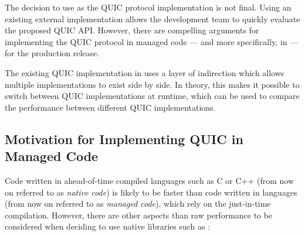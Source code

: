 The decision to use \libmsquic{} as the QUIC protocol implementation is not final. Using an existing
external implementation allows the development team to quickly evaluate the proposed QUIC API\@.
However, there are compelling arguments for implementing the QUIC protocol in managed \dotnet{} code
--- and more specifically, in \csharp{} --- for the production release.

The existing QUIC implementation in \dotnet{} uses a layer of indirection which allows multiple
implementations to exist side by side. In theory, this makes it possible to switch between QUIC
implementations at runtime, which can be used to compare the performance between different QUIC
implementations.


\subsection*{Motivation for Implementing QUIC in Managed Code}

Code written in ahead-of-time compiled languages such as C or C++ (from now on referred to as
\textit{native code}) is likely to be faster than code written in \dotnet{} languages (from now on
referred to as \textit{managed code}), which rely on the just-in-time compilation. However, there
are other aspects than raw performance to be considered when deciding to use native libraries such
as \libmsquic{}:

